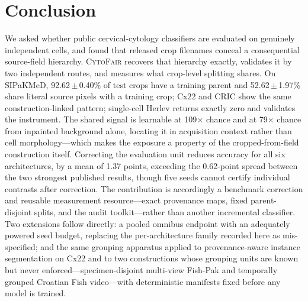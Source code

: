 \documentclass[conference]{IEEEtran}
\newcommand{\meanpm}[2]{#1\,$\pm$\,#2}
\newcommand{\cytofair}{\textsc{CytoFair}}
\begin{document}
\section{Conclusion}
We asked whether public cervical-cytology classifiers are evaluated on genuinely independent cells, and found that released crop filenames conceal a consequential source-field hierarchy.
\cytofair{} recovers that hierarchy exactly, validates it by two independent routes, and measures what crop-level splitting shares.
On SIPaKMeD, \meanpm{92.62}{0.40}\% of test crops have a training parent and \meanpm{52.62}{1.97}\% share literal source pixels with a training crop; Cx22 and CRIC show the same construction-linked pattern; single-cell Herlev returns exactly zero and validates the instrument.
The shared signal is learnable at 109$\times$ chance and at 79$\times$ chance from inpainted background alone, locating it in acquisition context rather than cell morphology---which makes the exposure a property of the cropped-from-field construction itself.
Correcting the evaluation unit reduces accuracy for all six architectures, by a mean of 1.37 points, exceeding the 0.62-point spread between the two strongest published results, though five seeds cannot certify individual contrasts after correction.
The contribution is accordingly a benchmark correction and reusable measurement resource---exact provenance maps, fixed parent-disjoint splits, and the audit toolkit---rather than another incremental classifier.
Two extensions follow directly: a pooled omnibus endpoint with an adequately powered seed budget, replacing the per-architecture family recorded here as mis-specified; and the same grouping apparatus applied to provenance-aware instance segmentation on Cx22 and to two constructions whose grouping units are known but never enforced---specimen-disjoint multi-view Fish-Pak and temporally grouped Croatian Fish video---with deterministic manifests fixed before any model is trained.


{\scriptsize}
\end{document}
